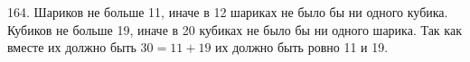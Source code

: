 164. Шариков не больше 11, иначе в 12 шариках не было бы ни одного кубика. Кубиков не больше 19, иначе в 20 кубиках не было бы ни одного шарика. Так как вместе их должно быть $30=11+19$ их должно быть ровно 11 и 19.\\
